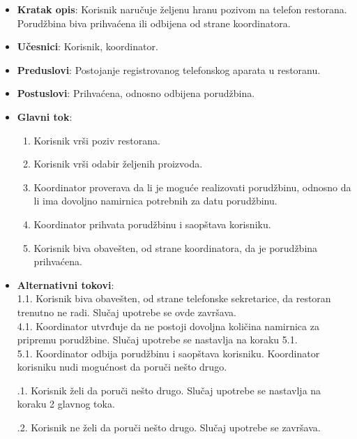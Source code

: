 \begin{itemize}
    \item \textbf{Kratak opis}: Korisnik naručuje željenu hranu pozivom na telefon restorana. Porudžbina biva prihvaćena ili odbijena od strane koordinatora.
    \item \textbf{Učesnici}: Korisnik, koordinator.
    \item \textbf{Preduslovi}: Postojanje registrovanog telefonskog aparata u restoranu.
    \item \textbf{Postuslovi}: Prihvaćena, odnosno odbijena porudžbina.
     \item \textbf{Glavni tok}:
    \begin{enumerate}
        \item Korisnik vrši poziv restorana.
        \item Korisnik vrši odabir željenih proizvoda.
        \item Koordinator proverava da li je moguće realizovati porudžbinu, odnosno
        da li ima dovoljno namirnica potrebnih za datu porudžbinu.
        \item Koordinator prihvata porudžbinu i saopštava korisniku.
        \item Korisnik biva obavešten, od strane koordinatora, da je porudžbina prihvaćena.
    \end{enumerate}
    \item \textbf{Alternativni tokovi}:\\
     1.1. Korisnik biva obavešten, od strane telefonske sekretarice, da restoran trenutno ne radi. Slučaj upotrebe se ovde završava.\\
     4.1. Koordinator utvrđuje da ne postoji dovoljna količina namirnica za pripremu porudžbine. Slučaj upotrebe se nastavlja na koraku 5.1.\\
     5.1. Koordinator odbija porudžbinu i saopštava korisniku. Koordinator korisniku nudi mogućnost da poruči nešto drugo.  
     
      .1. Korisnik želi da poruči nešto drugo. Slučaj upotrebe se nastavlja na koraku 2 glavnog toka. 
      
      .2. Korisnik ne želi da poruči nešto drugo. Slučaj upotrebe se završava. \\
    
    \end{itemize}
    
